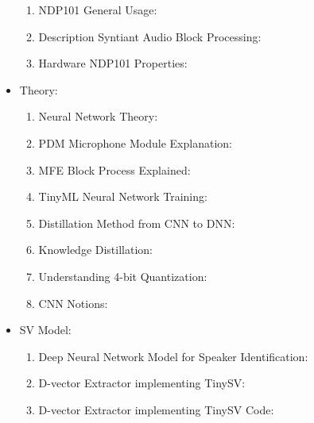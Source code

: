 \begin{itemize}
\begin{enumerate}
    \item NDP101 General Usage: \cite{description_ndp101}
    \item Description Syntiant Audio Block Processing: \cite{syntiant_audio_block}
    \item Hardware NDP101 Properties: \cite{hardware_ndp101}
\end{enumerate}
\item Theory:
\begin{enumerate}
    \item Neural Network Theory: \cite{neural_network_theory}
    \item PDM Microphone Module Explanation: \cite{PDM_module}
    \item MFE Block Process Explained: \cite{audio_processing_theory}
    \item TinyML Neural Network Training: \cite{neural_network_training}
    \item Distillation Method from CNN to DNN: \cite{distillation_from_cnn_to_dnn}
    \item Knowledge Distillation: \cite{knowledge_distillation}
    \item Understanding 4-bit Quantization: \cite{wu2023understandingint4quantizationtransformer}
    \item CNN Notions: \cite{introduction_CNN}
\end{enumerate}
\item SV Model:
\begin{enumerate}
    \item Deep Neural Network Model for Speaker Identification: \cite{dnn_speaker_verification}
    \item D-vector Extractor implementing TinySV: \cite{dvector_extractor_TinySV}
    \item D-vector Extractor implementing TinySV Code: \cite{dvector_extractor_code}
\end{enumerate}
\end{itemize}
\newpage


